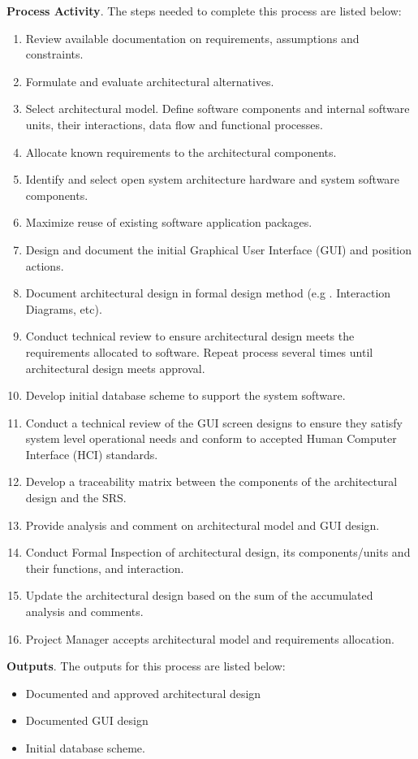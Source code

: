 \documentclass[a4paper, 11pt]{article}
\begin{document}
\textbf{Process Activity}. The steps needed to complete this process are listed below:
\begin{enumerate}
	\item Review available documentation on requirements, assumptions and constraints.
	\item Formulate and evaluate architectural alternatives.
	\item Select architectural model. Define software components and internal software units, their interactions, data flow and functional processes.
	\item Allocate known requirements to the architectural components.
	\item Identify and select open system architecture hardware and system software components.
	\item Maximize reuse of existing software application packages.
	\item Design and document the initial Graphical User Interface (GUI) and position actions.
	\item Document architectural design in formal design method (e.g . Interaction Diagrams, etc).
	\item Conduct technical review to ensure architectural design meets the requirements allocated to software. Repeat process several times until architectural design meets approval.
	\item Develop initial database scheme to support the system software.
	\item Conduct a technical review of the GUI screen designs to ensure they satisfy system level operational needs and conform to accepted Human Computer Interface (HCI) standards.
	\item Develop a traceability matrix between the components of the architectural design and the SRS.
	\item Provide analysis and comment on architectural model and GUI design.
	\item Conduct Formal Inspection of architectural design, its components/units and their functions, and interaction.
	\item Update the architectural design based on the sum of the accumulated analysis and comments.
	\item Project Manager accepts architectural model and requirements allocation.
\end{enumerate}

\textbf{Outputs}. The outputs for this process are listed below:
\begin{itemize}
	\item Documented and approved architectural design
	\item Documented GUI design
	\item Initial database scheme.
\end{itemize}
\end{document}
